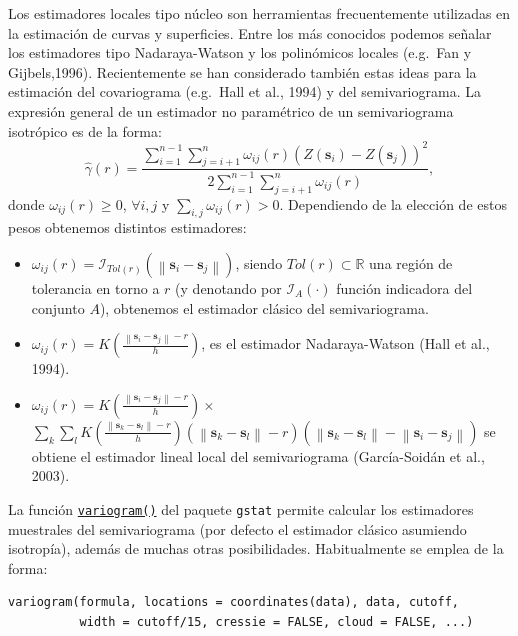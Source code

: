 \documentclass[
]{book}
\providecommand{\tightlist}{%
  \setlength{\itemsep}{0pt}\setlength{\parskip}{0pt}}
\theoremstyle{break}
\theoremstyle{definition}
\theoremstyle{definition}
\theoremstyle{definition}
\theoremstyle{definition}
\theoremstyle{remark}
\begin{document}
Los estimadores locales tipo núcleo son herramientas frecuentemente utilizadas en la estimación de curvas y superficies.
Entre los más conocidos podemos señalar los estimadores tipo Nadaraya-Watson y los polinómicos locales (e.g.~Fan y Gijbels,1996).
Recientemente se han considerado también estas ideas para la estimación del covariograma (e.g.~Hall et al., 1994) y del semivariograma.
La expresión general de un estimador no paramétrico de un semivariograma isotrópico es de la forma:
\[\hat{\gamma}(r) = \dfrac{\sum\limits_{i=1}^{n-1}\sum\limits_{j=i+1}^{n}\omega_{ij}
(r)\left( Z(\mathbf{s}_{i})-Z(\mathbf{s}_{j})\right)^2  
}{2\sum\limits_{i=1}^{n-1}\sum\limits_{j=i+1}^{n}\omega_{ij}(r)},\]
donde \(\omega_{ij}(r) \geq 0\), \(\forall i,j\) y \(\sum_{i,j}\omega_{ij}(r) > 0\).
Dependiendo de la elección de estos pesos obtenemos distintos estimadores:

\begin{itemize}
\tightlist
\item
  \(\omega_{ij}(r) = \mathcal{I}_{Tol(r)} \left( \left\| \mathbf{s}_{i} - \mathbf{s}_{j} \right\| \right)\), siendo \(Tol(r)\subset \mathbb{R}\) una región de tolerancia en torno a \(r\) (y denotando por \(\mathcal{I}_{A}(\cdot)\) función indicadora del conjunto \(A\)), obtenemos el estimador clásico del semivariograma.
\item
  \(\omega_{ij}(r)=K\left( \frac{\left\| \mathbf{s}_{i} -\mathbf{s}_{j} \right\| -r}{h} \right)\), es el estimador Nadaraya-Watson (Hall et al., 1994).
\item
  \(\omega_{ij}(r)=K\left( \frac{\left\| \mathbf{s}_{i} -\mathbf{s}_{j} \right\| -r}{h} \right) \times\) \(\sum\limits_{k}\sum\limits_{l}K\left( \frac{\left\| \mathbf{s}_{k} -\mathbf{s}_{l} \right\| -r}{h} \right)   \left( \left\| \mathbf{s}_{k} -\mathbf{s}_{l} \right\| -r\right) \left( \left\| \mathbf{s}_{k} -\mathbf{s}_{l} \right\| -\left\| \mathbf{s}_{i} -\mathbf{s}_{j} \right\| \right)\) se obtiene el estimador lineal local del semivariograma (García-Soidán et al., 2003).
\end{itemize}

La función \href{https://r-spatial.github.io/gstat/reference/variogram.html}{\texttt{variogram()}} del paquete \texttt{gstat} permite calcular los estimadores muestrales del semivariograma (por defecto el estimador clásico asumiendo isotropía), además de muchas otras posibilidades.
Habitualmente se emplea de la forma:

\begin{verbatim}
variogram(formula, locations = coordinates(data), data, cutoff, 
          width = cutoff/15, cressie = FALSE, cloud = FALSE, ...)
\end{verbatim}
\end{document}
